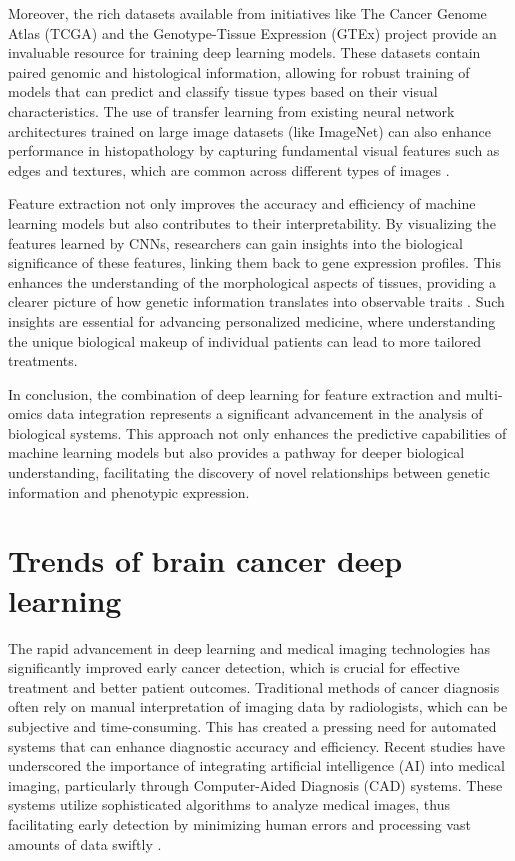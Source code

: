 \documentclass[runningheads]{llncs}
\begin{document}
Moreover, the rich datasets available from initiatives like The Cancer Genome Atlas (TCGA) and the Genotype-Tissue Expression (GTEx) project provide an invaluable resource for training deep learning models. These datasets contain paired genomic and histological information, allowing for robust training of models that can predict and classify tissue types based on their visual characteristics. The use of transfer learning from existing neural network architectures trained on large image datasets (like ImageNet) can also enhance performance in histopathology by capturing fundamental visual features such as edges and textures, which are common across different types of images \cite{Liviu_2020}.

Feature extraction not only improves the accuracy and efficiency of machine learning models but also contributes to their interpretability. By visualizing the features learned by CNNs, researchers can gain insights into the biological significance of these features, linking them back to gene expression profiles. This enhances the understanding of the morphological aspects of tissues, providing a clearer picture of how genetic information translates into observable traits \cite{Nam_2020}. Such insights are essential for advancing personalized medicine, where understanding the unique biological makeup of individual patients can lead to more tailored treatments.

In conclusion, the combination of deep learning for feature extraction and multi-omics data integration represents a significant advancement in the analysis of biological systems. This approach not only enhances the predictive capabilities of machine learning models but also provides a pathway for deeper biological understanding, facilitating the discovery of novel relationships between genetic information and phenotypic expression.
\section{Trends of brain cancer deep learning}
The rapid advancement in deep learning and medical imaging technologies has significantly improved early cancer detection, which is crucial for effective treatment and better patient outcomes. Traditional methods of cancer diagnosis often rely on manual interpretation of imaging data by radiologists, which can be subjective and time-consuming. This has created a pressing need for automated systems that can enhance diagnostic accuracy and efficiency. Recent studies have underscored the importance of integrating artificial intelligence (AI) into medical imaging, particularly through Computer-Aided Diagnosis (CAD) systems. These systems utilize sophisticated algorithms to analyze medical images, thus facilitating early detection by minimizing human errors and processing vast amounts of data swiftly \cite{Istiak_2024}.
\end{document}
